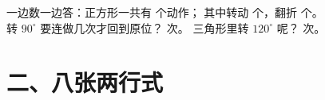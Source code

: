 \begin{sikao}
  一边数一边答：正方形一共有 \underline{\hspace{1.6em}} 个动作；
  其中转动 \underline{\hspace{1.2em}} 个，翻折 \underline{\hspace{1.2em}} 个。\\[4pt]
  转 \(90^\circ\) 要连做几次才回到原位？\underline{\hspace{1.6em}} 次。
  三角形里转 \(120^\circ\) 呢？\underline{\hspace{1.6em}} 次。
\end{sikao}

\section*{二、八张两行式}

